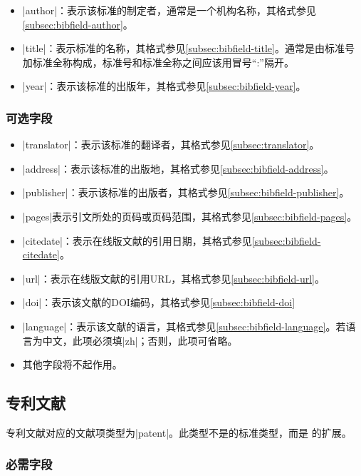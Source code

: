 \begin{itemize}
\item |author|：表示该标准的制定者，通常是一个机构名称，其格式参见\ref{subsec:bibfield-author}。
\item |title|：表示标准的名称，其格式参见\ref{subsec:bibfield-title}。通常是由标准号
 加标准全称构成，标准号和标准全称之间应该用冒号``:''隔开。
\item |year|：表示该标准的出版年，其格式参见\ref{subsec:bibfield-year}。
\end{itemize}

\subsubsection{可选字段}

\begin{itemize}
\item |translator|：表示该标准的翻译者，其格式参见\ref{subsec:translator}。
\item |address|：表示该标准的出版地，其格式参见\ref{subsec:bibfield-address}。
\item |publisher|：表示该标准的出版者，其格式参见\ref{subsec:bibfield-publisher}。
\item |pages|表示引文所处的页码或页码范围，其格式参见\ref{subsec:bibfield-pages}。
\item |citedate|：表示在线版文献的引用日期，其格式参见\ref{subsec:bibfield-citedate}。
\item |url|：表示在线版文献的引用URL，其格式参见\ref{subsec:bibfield-url}。
\item |doi|：表示该文献的DOI编码，其格式参见\ref{subsec:bibfield-doi}
\item |language|：表示该文献的语言，其格式参见\ref{subsec:bibfield-language}。若语
  言为中文，此项必须填|zh|；否则，此项可省略。
\item 其他字段将不起作用。
\end{itemize}

\subsection{专利文献}\label{subsec:bibtype-patent}

专利文献对应的{\BibTeX}文献项类型为|patent|。此类型不是{\BibTeX}的标准类型，而是
{\njuthesis}的扩展。

\subsubsection{必需字段}

